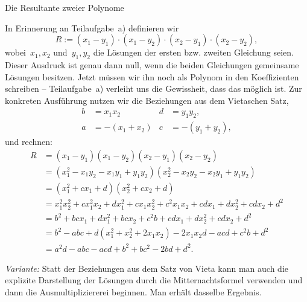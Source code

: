 \documentclass{algblatt}
\begin{document}
\begin{aufgabe}{Die Resultante zweier Polynome}
\begin{loesungE}
\item In Erinnerung an Teilaufgabe~a) definieren wir
\[ R := (x_1 - y_1) \cdot (x_1 - y_2) \cdot (x_2 - y_1) \cdot (x_2 - y_2), \]
wobei~$x_1,x_2$ und~$y_1,y_2$ die Lösungen der ersten bzw. zweiten Gleichung
seien. Dieser Ausdruck ist genau dann null, wenn die beiden Gleichungen
gemeinsame Lösungen besitzen. Jetzt müssen wir ihn noch als Polynom in den
Koeffizienten schreiben -- Teilaufgabe~a) verleiht uns die Gewissheit, dass das
möglich ist. Zur konkreten Ausführung nutzen wir die Beziehungen aus dem
Vietaschen Satz,
\begin{align*}
  b &= x_1 x_2 & d &= y_1 y_2, \\
  a &= -(x_1+x_2) & c &= -(y_1 + y_2),
\end{align*}
und rechnen:
\begin{align*}
  R &= (x_1 - y_1) (x_1 - y_2) (x_2 - y_1) (x_2 - y_2) \\
  &= (x_1^2 - x_1y_2 - x_1y_1 + y_1y_2) (x_2^2 - x_2y_2 - x_2y_1 + y_1y_2) \\
  &= (x_1^2 + cx_1 + d) (x_2^2 + cx_2 + d) \\
  &= x_1^2 x_2^2 + c x_1^2 x_2 + d x_1^2 + c x_1 x_2^2 + c^2 x_1 x_2 +
    c d x_1 + d x_2^2 + cd x_2 + d^2 \\
  &= b^2 + bcx_1 + dx_1^2 + bcx_2 + c^2b + cdx_1 + dx_2^2 + cdx_2 + d^2 \\
  &= b^2 - abc + d(x_1^2 + x_2^2 + 2x_1x_2) - 2x_1x_2d - acd + c^2b + d^2 \\
  &= a^2d - abc - acd + b^2 + bc^2 - 2bd + d^2.
\end{align*}

\emph{Variante:} Statt der Beziehungen aus dem Satz von Vieta kann man auch die
explizite Darstellung der Lösungen durch die Mitternachtsformel verwenden und
dann die Ausmultipliziererei beginnen. Man erhält dasselbe Ergebnis.


\end{loesungE}
\end{aufgabe}
\end{document}
